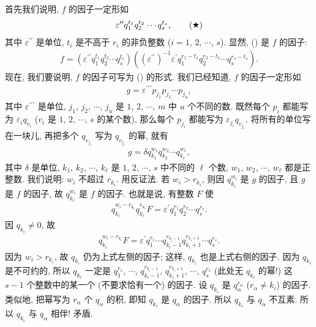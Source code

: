 \begin{pf}
    首先我们说明, $f$ 的因子一定形如
    \begin{align*}
        \varepsilon^{\prime \prime} q_1^{t_1} q_2^{t_2} \cdots q_s^{t_s}, \tag*{(\ding{72})}
    \end{align*}
    其中 $\varepsilon^{\prime \prime}$ 是单位, $t_i$ 是不高于 $r_i$ 的非负整数 ($i = 1$, $2$, $\cdots$, $s$). 显然, () 是 $f$ 的因子:
    \begin{align*}
        f = \left(\varepsilon^{\prime \prime} q_1^{t_1} q_2^{t_2} \cdots q_s^{t_s}\right) \left((\varepsilon^{\prime \prime})^{-1} \varepsilon^{\prime} q_1^{r_1 - t_1} q_2^{r_2 - t_2} \cdots q_s^{r_s - t_s}\right).
    \end{align*}
    现在, 我们要说明, $f$ 的因子可写为 () 的形式. 我们已经知道, $f$ 的因子一定形如
    \begin{align*}
        g = \varepsilon^{\prime \prime \prime} p_{j_1} p_{j_2} \cdots p_{j_u},
    \end{align*}
    其中 $\varepsilon^{\prime \prime \prime}$ 是单位, $j_1$, $j_2$, $\cdots$, $j_u$ 是 $1$, $2$, $\cdots$, $m$ 中 $u$ 个不同的数. 既然每个 $p_i$ 都能写为 $\varepsilon_i q_{v_i}$ ($v_i$ 是 $1$, $2$, $\cdots$, $s$ 的某个数), 那么每个 $p_{j_i}$ 都能写为 $\varepsilon_{j_i} q_{v_{j_i}}$. 将所有的单位写在一块{\scriptsize 儿}, 再把多个 $q_{v_{j_i}}$ 写为 $q_{v_{j_i}}$ 的幂, 就有
    \begin{align*}
        g = \delta q_{k_1}^{w_1} q_{k_2}^{w_2} \cdots q_{k_\ell}^{w_\ell},
    \end{align*}
    其中 $\delta$ 是单位, $k_1$, $k_2$, $\cdots$, $k_\ell$ 是 $1$, $2$, $\cdots$, $s$ 中不同的 $\ell$ 个数, $w_1$, $w_2$, $\cdots$, $w_\ell$ 都是正整数. 我们说明: $w_i$ 不超过 $r_{k_i}$. 用反证法. 若 $w_i > r_{k_i}$, 则因 $q_{k_i}^{w_i}$ 是 $g$ 的因子, 且 $g$ 是 $f$ 的因子, 故 $q_{k_i}^{w_i}$ 是 $f$ 的因子. 也就是说, 有整数 $F$ 使
    \begin{align*}
        q_{k_i}^{w_i-r_{k_i}} q_{k_i}^{r_{k_i}} F = \varepsilon^{\prime} q_1^{r_1} q_2^{r_2} \cdots q_s^{r_s}.
    \end{align*}
    因 $q_{k_i} \neq 0$, 故
    \begin{align*}
        q_{k_i}^{w_i-r_{k_i}} F = \varepsilon^{\prime} q_1^{r_1} \cdots q_{k_i - 1}^{r_{k_i - 1}} q_{k_i + 1}^{r_{k_i + 1}} \cdots q_s^{r_s}.
    \end{align*}
    因为 $w_i > r_{k_i}$, 故 $q_{k_i}$ 仍为上式左侧的因子; 这样, $q_{k_i}$ 也是上式右侧的因子. 因为 $q_{k_i}$ 是不可约的, 所以 $q_{k_i}$ 一定是 $q_1^{r_1}$, $\cdots$, $q_{k_i - 1}^{r_{k_i - 1}}$, $q_{k_i + 1}^{r_{k_i + 1}}$, $\cdots$, $q_s^{r_s}$ (此处无 $q_{k_i}$ 的幂!) 这 $s-1$ 个整数中的某一个 (不要求恰有一个) 的因子. 设 $q_{k_i}$ 是 $q_\alpha^{r_\alpha}$ ($r_\alpha \neq k_i$) 的因子. 类似地, 把幂写为 $r_\alpha$ 个 $q_\alpha$ 的积, 即知 $q_{k_i}$ 是 $q_\alpha$ 的因子. 所以 $q_{k_i}$ 与 $q_\alpha$ 不互素. 所以 $q_{k_i}$ 与 $q_\alpha$ 相伴! 矛盾.


\end{pf}

